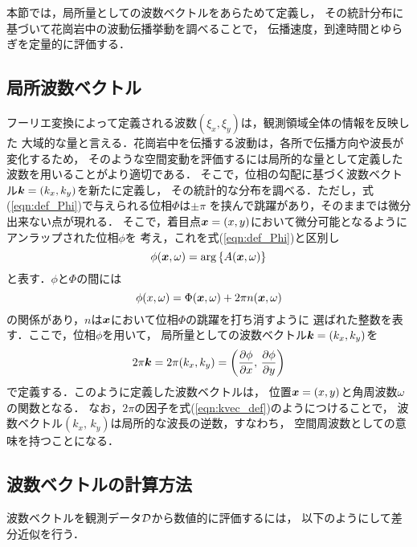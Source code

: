 ﻿本節では，局所量としての波数ベクトルをあらためて定義し，
その統計分布に基づいて花崗岩中の波動伝播挙動を調べることで，
伝播速度，到達時間とゆらぎを定量的に評価する．
\subsection{局所波数ベクトル}
フーリエ変換によって定義される波数$(\xi_x,\xi_y)$は，観測領域全体の情報を反映した
大域的な量と言える．花崗岩中を伝播する波動は，各所で伝播方向や波長が変化するため，
そのような空間変動を評価するには局所的な量として定義した波数を用いることがより適切である．
そこで，位相の勾配に基づく波数ベクトル$\mbox{\boldmath{$k$}}=(k_x,k_y)$を新たに定義し，
その統計的な分布を調べる．ただし，式(\ref{eqn:def_Phi})で与えられる位相$\Phi$は$\pm \pi$
を挟んで跳躍があり，そのままでは微分出来ない点が現れる．
そこで，着目点$\mbox{\boldmath{$x$}}=(x,y)$において微分可能となるようにアンラップされた位相$\phi$を
考え，これを式(\ref{eqn:def_Phi})と区別し
\begin{equation}
	\phi(\fat{x},\omega)=\arg\left\{  A(\fat{x},\omega) \right\}
	\label{eqn:def_phi}
\end{equation}
と表す．$\phi$と$\Phi$の間には
\begin{equation}
	\phi(x,\omega)=\Phi(\fat{x},\omega) + 2\pi n(\fat{x},\omega )
	\label{eqn:unwrap}
\end{equation}
の関係があり，$n$は$\mbox{\boldmath{$x$}}$において位相$\Phi$の跳躍を打ち消すように
選ばれた整数を表す．ここで，位相$\phi$を用いて，
局所量としての波数ベクトル$\mbox{\boldmath{$k$}}=(k_x,k_y)$を
\begin{equation}
	2\pi \fat{k}= 
	2\pi (k_x,k_y)=
	\left(
		\frac{\partial \phi}{\partial x}
		, \, 
		\frac{\partial \phi}{\partial y} 
	\right)
	\label{eqn:kvec_def}
\end{equation}
で定義する．このように定義した波数ベクトルは，
位置$\mbox{\boldmath{$x$}}=(x,y)$と角周波数$\omega$の関数となる．
なお，$2\pi$の因子を式(\ref{eqn:kvec_def})のようにつけることで，
波数ベクトル$(k_x,\,k_y)$は局所的な波長の逆数，すなわち，
空間周波数としての意味を持つことになる．
\subsection{波数ベクトルの計算方法}
波数ベクトルを観測データ$\cal D$から数値的に評価するには，
以下のようにして差分近似を行う．

